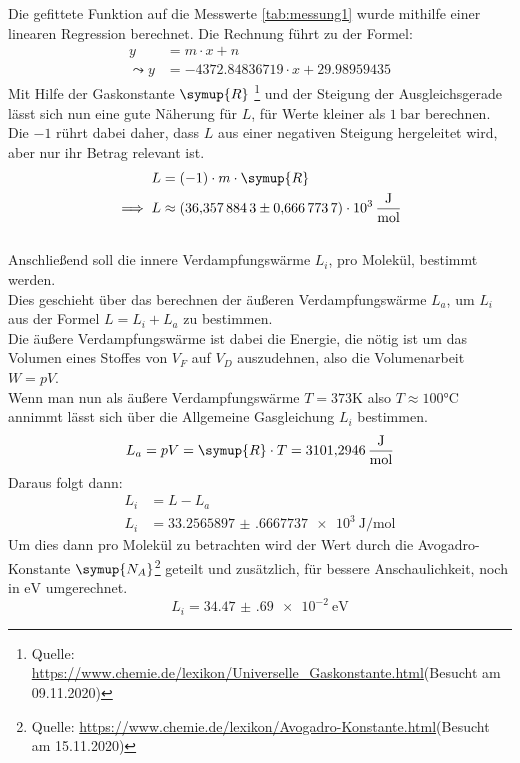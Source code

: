 Die gefittete Funktion auf die Messwerte \ref{tab:messung1} wurde mithilfe einer linearen Regression berechnet.
Die Rechnung führt zu der Formel:
\begin{align}
    y&=m\cdot x+n\\
    \leadsto y&=-4372.84836719 \cdot x+29.98959435
\end{align}
Mit Hilfe der Gaskonstante $\symup{R}$   \footnote{Quelle: \url{https://www.chemie.de/lexikon/Universelle_Gaskonstante.html}(Besucht am 09.11.2020)}
und der Steigung der Ausgleichsgerade lässt sich nun eine gute Näherung für $L$, für Werte kleiner als $\SI{1}{\bar}$ berechnen.
Die $-1$ rührt dabei daher, dass $L$ aus einer negativen Steigung hergeleitet wird, aber nur ihr Betrag relevant ist.
\begin{align}
    L&=(-1) \cdot m \cdot \symup{R}\\
    \implies L&\approx\SI{36.3578843(6667737)e3}{\joule\per\mol} \nonumber
\end{align}\\
Anschließend soll die innere Verdampfungswärme $L_i$, pro Molekül, bestimmt werden.\\
Dies geschieht über das berechnen der äußeren Verdampfungswärme $L_a$, um $L_i$ aus der Formel $L=L_i+L_a$ zu bestimmen.\\
Die äußere Verdampfungswärme ist dabei die Energie, die nötig ist um das Volumen eines Stoffes von $V_F$ auf $V_D$ auszudehnen,
also die Volumenarbeit $W=pV$.\\
Wenn man nun als äußere Verdampfungswärme $T=373 \si{\kelvin}$ also $T\approx 100 \si{\celsius}$ annimmt lässt sich über die Allgemeine Gasgleichung $L_i$ bestimmen.
\begin{equation}
    L_a=pV=\symup{R} \cdot T = \SI{3101.2946}{\joule\per\mol} 
\end{equation}
Daraus folgt dann:
\begin{align}
    L_i&=L-L_a \\
    L_i&=\SI{33.2565897(6667737)e3}{\joule\per\mol} \nonumber
\end{align}
Um dies dann pro Molekül zu betrachten wird der Wert durch die Avogadro-Konstante $\symup{N_A}$\footnote{Quelle: \url{https://www.chemie.de/lexikon/Avogadro-Konstante.html}(Besucht am 15.11.2020)}
geteilt und zusätzlich, für bessere Anschaulichkeit,
noch in $\si{\electronvolt}$ umgerechnet.
\begin{equation}
    L_i=\SI{34.47(69)e-2}{\electronvolt} \nonumber
\end{equation}

